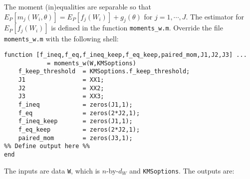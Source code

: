 \documentclass[12pt]{article}
\def\code#1{\texttt{#1}}
\begin{document}
The moment (in)equalities are separable so that $E_P[m_j(W_i,\theta)] = E_P[f_j(W_i)] + g_j(\theta)$ for $j=1,\cdots,J$.  The estimator for $E_P[f_j(W_i)]$ is defined in the function \code{moments\_w.m}.  Override the  file \code{moments\_w.m} with the following shell:

\footnotesize
\begin{lstlisting}[backgroundcolor = \color{gray!30},
                   xleftmargin = 0cm,
                   framexleftmargin = 1em]
function [f_ineq,f_eq,f_ineq_keep,f_eq_keep,paired_mom,J1,J2,J3] ...
            = moments_w(W,KMSoptions)
    f_keep_threshold  = KMSoptions.f_keep_threshold;
    J1                = XX1;
    J2                = XX2;
    J3                = XX3;
    f_ineq            = zeros(J1,1);
    f_eq              = zeros(2*J2,1);
    f_ineq_keep       = zeros(J1,1);
    f_eq_keep         = zeros(2*J2,1);
    paired_mom        = zeros(J3,1);
%% Define output here %%
end
\end{lstlisting} \normalsize
The inputs are data \code{W}, which is $n$-by-$d_W$ and \code{KMSoptions}.  The outputs are:
\end{document}
